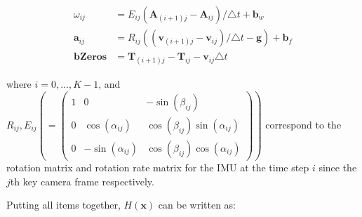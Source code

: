 \documentclass[12pt]{article}   %
\begin{document}
\begin{align}
\omega_{ij} &= E_{ij} (\textbf{A}_{(i+1)j} - \textbf{A}_{ij})/\triangle t + \textbf{b}_w \\
\textbf{a}_{ij} &= R_{ij} ((\textbf{v}_{(i+1)j} - \textbf{v}_{ij}) / \triangle t - \textbf{g}) + \textbf{b}_f \\
\textbf{bZeros} &= \textbf{T}_{(i+1)j} - \textbf{T}_{ij} - \textbf{v}_{ij} \triangle t
\end{align}

where $i = 0,..., K-1$, and $R_{ij}, E_{ij} ( = \begin{pmatrix} 1 & 0 & -\sin(\beta_{ij}) \\ 0 & \cos(\alpha_{ij}) & \cos(\beta_{ij})\sin(\alpha_{ij}) \\ 0 & -\sin(\alpha_{ij}) & \cos(\beta_{ij})\cos(\alpha_{ij}) \end{pmatrix}) $ correspond to the rotation matrix and rotation rate matrix for the IMU at the time step $i$ since the $j$th key camera frame respectively.

Putting all items together, $H(\textbf{x})$ can be written as:
\end{document}
